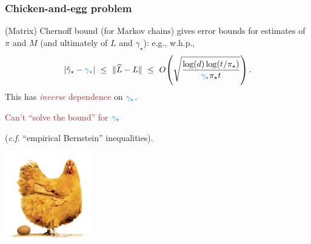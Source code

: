 \documentclass[11pt,compress,blue4,notheorems,handout]{beamer}
\newcommand{\FIREBRICK}[1]{\textcolor{firebrick}{#1}}
\newcommand{\AZURE}[1]{\textcolor{azure}{#1}}
\newcommand\fns\footnotesize
\newcommand\pimin{\ensuremath{\pi_{\star}}}
\newcommand\gap{\ensuremath{\gamma_{\star}}}
\newcommand\hatgap{\ensuremath{\hat{\gamma}_{\star}}}
\begin{document}

\begin{frame}
  \frametitle{Chicken-and-egg problem}

  (Matrix) Chernoff bound {\fns(for Markov chains)} gives error bounds
  for estimates of $\pi$ and $M$ (and ultimately of $L$ and $\gap$):
  e.g., w.h.p.,
  \[
    \abs{\hatgap-\AZURE{\gap}}
    \ \leq \
    \norm{\wh L - L}
    \ \leq \
    O\Parens{
      \sqrt{\frac{\log(d)\log(t/\pimin)}{\AZURE{\gap}\pimin t}}
    }
    \,.
  \]
  \onslide<2->
  This has \FIREBRICK{\emph{inverse} dependence} on $\AZURE{\gap}$.

  \onslide<3->
  \begin{center}
    \FIREBRICK{%
      Can't ``solve the bound'' for $\AZURE{\gap}$
    }

    {\fns(\emph{c.f.} ``empirical Bernstein'' inequalities)}.

    \includegraphics[height=1.5in]{chicken-and-egg.jpg}
  \end{center}

\end{frame}

\end{document}
